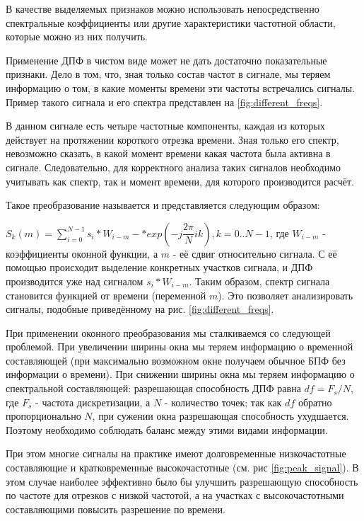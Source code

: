 В качестве выделяемых признаков можно использовать непосредственно спектральные коэффициенты или другие характеристики частотной области, которые можно из них получить.

Применение ДПФ в чистом виде может не дать достаточно показательные признаки. Дело в том, что, зная только состав частот в сигнале, мы теряем информацию о том, в какие моменты времени эти частоты встречались сигналы. Пример такого сигнала и его спектра представлен на \ref{fig:different_freqs}.


В данном сигнале есть четыре частотные компоненты, каждая из которых действует на протяжении короткого отрезка времени. Зная только его спектр, невозможно сказать, в какой момент времени какая частота была активна в сигнале. Следовательно, для корректного анализа таких сигналов необходимо учитывать как спектр, так и момент времени, для которого производится расчёт. 

Такое преобразование называется  и представляется следующим образом:

$S_k(m)=\sum_{i=0}^{N-1} s_i*W_{i-m}-*exp(-j\dfrac{2\pi}{N}ik), k=0..N-1$, где $W_{i-m}$ - коэффициенты оконной функции, а $m$ - её сдвиг относительно сигнала. С её помощью происходит выделение конкретных участков сигнала, и ДПФ производится уже над сигналом $s_i*W_{i-m}$. Таким образом, спектр сигнала становится функцией от времени (переменной $m$). Это позволяет анализировать сигналы, подобные приведённому на рис. \ref{fig:different_freqs}\cite{wavelet_tutorial}.

При применении оконного преобразования мы сталкиваемся со следующей проблемой. При увеличении ширины окна мы теряем информацию о временной составляющей (при максимально возможном окне получаем обычное БПФ без информации о времени). При снижении ширины окна мы теряем информацию о спектральной составляющей: разрешающая способность ДПФ равна $df=F_s/N$, где $F_s$ - частота дискретизации, а $N$ - количество точек; так как $df$ обратно пропорционально $N$, при сужении окна разрешающая способность ухудшается. Поэтому необходимо соблюдать баланс между этими видами информации. 


При этом многие сигналы на практике имеют долговременные низкочастотные составляющие и кратковременные высокочастотные (см. рис \ref{fig:peak_signal}\cite{wavelet_tutorial}). В этом случае наиболее эффективно было бы улучшить разрешающую способность по частоте для отрезков с низкой частотой, а на участках с высокочастотными составляющими повысить разрешение по времени. 

